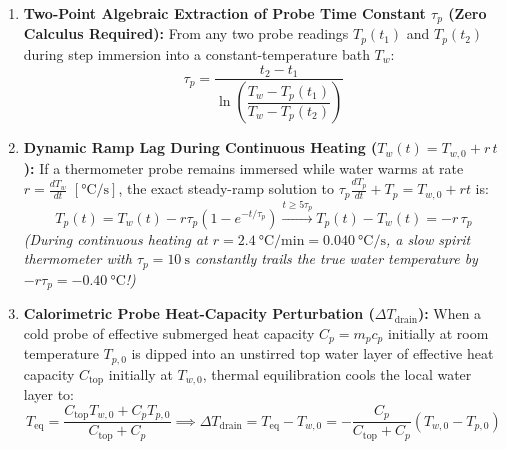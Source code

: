 \begin{formulacard}
\begin{enumerate}
\begin{center}
\begin{tabular}{@{}lcccccc@{}}
  \bottomrule
  \end{tabular}
  \end{center}
  \item \textbf{Two-Point Algebraic Extraction of Probe Time Constant $\tau_p$ (Zero Calculus Required):} 
  From any two probe readings $T_p(t_1)$ and $T_p(t_2)$ during step immersion into a constant-temperature bath $T_w$:
  \begin{equation}\label{eq:17:taup2pt}
    \tau_p = \frac{t_2 - t_1}{\ln\!\left(\dfrac{T_w - T_p(t_1)}{T_w - T_p(t_2)}\right)}
  \end{equation}
  \item \textbf{Dynamic Ramp Lag During Continuous Heating ($T_w(t) = T_{w,0} + r\,t$):} 
  If a thermometer probe remains immersed while water warms at rate $r = \frac{dT_w}{dt}$ $[\si{\celsius\per\second}]$, the exact steady-ramp solution to $\tau_p \frac{dT_p}{dt} + T_p = T_{w,0} + rt$ is:
  \begin{equation}\label{eq:17:ramplag}
    T_p(t) = T_w(t) - r\tau_p\left(1 - e^{-t/\tau_p}\right) \xrightarrow{t \ge 5\tau_p} T_p(t) - T_w(t) = -r\,\tau_p
  \end{equation}
  \emph{(During continuous heating at $r = \SI{2.4}{\celsius\per\minute} = \SI{0.040}{\celsius\per\second}$, a slow spirit thermometer with $\tau_p = \SI{10}{\second}$ constantly trails the true water temperature by $-r\tau_p = -\SI{0.40}{\celsius}$!)}
  \item \textbf{Calorimetric Probe Heat-Capacity Perturbation ($\Delta T_{\mathrm{drain}}$):} 
  When a cold probe of effective submerged heat capacity $C_p = m_p c_p$ initially at room temperature $T_{p,0}$ is dipped into an unstirred top water layer of effective heat capacity $C_{\mathrm{top}}$ initially at $T_{w,0}$, thermal equilibration cools the local water layer to:
  \begin{equation}\label{eq:17:probedrain}
    T_{\mathrm{eq}} = \frac{C_{\mathrm{top}} T_{w,0} + C_p T_{p,0}}{C_{\mathrm{top}} + C_p} \implies \Delta T_{\mathrm{drain}} = T_{\mathrm{eq}} - T_{w,0} = -\frac{C_p}{C_{\mathrm{top}} + C_p}\left(T_{w,0} - T_{p,0}\right)
  \end{equation}
\end{enumerate}
\end{formulacard}


